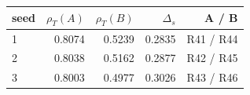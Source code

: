 \begin{tabular}{lrrrr}
\toprule
seed & $\rho_T(A)$ & $\rho_T(B)$ & $\Delta_s$ & A / B \\
\midrule
1 & 0.8074 & 0.5239 & 0.2835 & R41 / R44 \\
2 & 0.8038 & 0.5162 & 0.2877 & R42 / R45 \\
3 & 0.8003 & 0.4977 & 0.3026 & R43 / R46 \\
\bottomrule
\end{tabular}